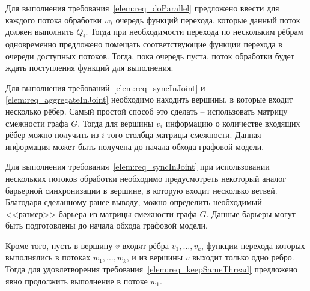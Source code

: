 Для выполнения требования~\ref{elem:req_doParallel} предложено ввести для каждого потока обработки $w_i$ очередь функций перехода, которые данный поток должен выполнить $Q_i$. Тогда при необходимости перехода по нескольким рёбрам одновременно предложено помещать соответствующие функции перехода в очереди доступных потоков. Тогда, пока очередь пуста, поток обработки будет ждать поступления функций для выполнения.

Для выполнения требований~\ref{elem:req_syncInJoint} и \ref{elem:req_aggregateInJoint} необходимо находить вершины, в которые входит несколько рёбер. Самый простой способ это сделать -- использовать матрицу смежности графа $G$. Тогда для вершины $v_i$ информацию о количестве входящих рёбер можно получить из $i$-того столбца матрицы смежности. Данная информация может быть получена до начала обхода графовой модели.

Для выполнения требования~\ref{elem:req_syncInJoint} при использовании нескольких потоков обработки необходимо предусмотреть некоторый аналог барьерной синхронизации в вершине, в которую входит несколько ветвей. Благодаря сделанному ранее выводу, можно определить необходимый <<размер>> барьера из матрицы смежности графа $G$. Данные барьеры могут быть подготовлены до начала обхода графовой модели.

Кроме того, пусть в вершину $v$ входят рёбра $v_1, \dots, v_k$, функции перехода которых выполнялись в потоках $w_1, \dots, w_k$, и из вершины $v$ выходит только одно ребро. Тогда для удовлетворения требования~\ref{elem:req_keepSameThread} предложено явно продолжить выполнение в потоке $w_1$.

\noteattributes{}
